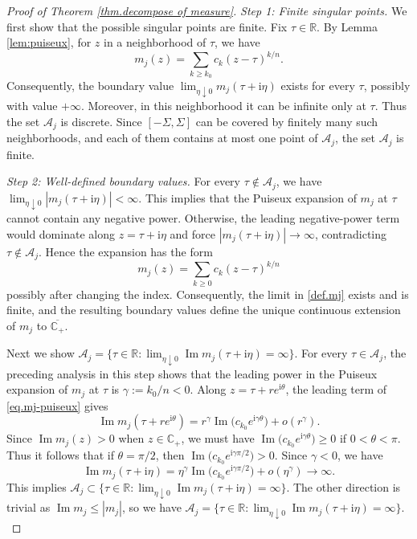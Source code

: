 \documentclass[11pt,twoside, a4paper]{article}
\numberwithin{equation}{section}
\numberwithin{figure}{section}
\theoremstyle{plain} %
\theoremstyle{definition}
\theoremstyle{remark}
\newcommand{\1} {\mspace{1 mu}}
\newcommand{\2} {\mspace{2 mu}}
\newcommand{\R} {\mathbb{R}}
\newcommand{\Cp} {\mathbb {C}_+}
\DeclareMathOperator{\im}{Im}
\begin{document}
\bigskip
\begin{proof}[Proof of Theorem \ref{thm.decompose of measure}]

\textit{Step 1: Finite singular points.}
We first show that the possible singular points are finite. Fix $\tau\in\R$. By Lemma \ref{lem:puiseux}, for $z$ in a neighborhood of $\tau$, we have
\begin{equation}\label{eq.mj-puiseux}
   m_j(z)=\sum_{k\ge k_0}c_k(z-\tau)^{k/n}.
\end{equation}
 Consequently, the boundary value
$
  \lim_{\eta\downarrow0} m_j(\tau+\mathrm i\eta)
$
exists for every \(\tau\), possibly with value \(+\infty\). Moreover, in this neighborhood it can be infinite only at \(\tau\). 
Thus the set $\mathcal{A}_j$ is discrete. 
Since \([-\Sigma,\Sigma]\) can be covered by finitely many such neighborhoods, and each of them contains at most one point of \(\mathcal A_j\), the set \(\mathcal A_j\) is finite.
\medskip

\textit{Step 2: Well-defined boundary values.} 
For every $\tau\notin\mathcal{A}_j$, we have $\lim_{\eta\downarrow 0}|m_j(\tau+\mathrm i\eta)|<\infty$. 
This implies that the Puiseux expansion of \(m_j\) at \(\tau\) cannot contain any negative power. 
Otherwise, the leading negative-power term would dominate along \(z=\tau+\mathrm i\eta\) and force \(|m_j(\tau+\mathrm i\eta)|\to\infty\), contradicting \(\tau\notin\mathcal A_j\).
Hence the expansion has the form
\begin{equation}\label{eq.nonnegative-puiseux}
    m_j(z)=\sum_{k\ge0}c_k(z-\tau)^{k/n}  
\end{equation}
possibly after changing the index. Consequently, the limit in \eqref{def.mj} exists and is finite, and the resulting boundary values define the unique continuous extension of \(m_j\) to \(\overline{\mathbb C_+}\).

Next we show $\mathcal{A}_j=\big\{\tau\in\mathbb R:
  \lim_{\eta\downarrow0}\im m_j(\tau+\mathrm i\eta)=\infty
  \big\}$. For every \(\tau\in\mathcal A_j\), the preceding analysis in this step shows
  that the leading power in the Puiseux expansion of \(m_j\) at \(\tau\) is
  $
  \gamma:=k_0/n<0.
  $
  Along \(z=\tau+r e^{\mathrm i\theta}\),
the leading term of \eqref{eq.mj-puiseux} gives
\[
  \im m_j(\tau+r e^{\mathrm i\theta})
  =
  r^\gamma \im \bigl(c_{k_0}e^{\mathrm i\gamma\theta}\bigr)
  +o(r^\gamma).
\]
Since \(\im m_j(z)>0\) when $z\in \Cp$, 
we must have $\im \bigl(c_{k_0}e^{\mathrm i\gamma\theta}\bigr)\geq 0$ if $0<\theta<\pi$. Thus it follows that if \(\theta=\pi/2\), then $\im \bigl(c_{k_0}e^{\mathrm i\gamma\pi/2}\bigr)> 0$. Since \(\gamma<0\), we have
\[
  \im m_j(\tau+\mathrm i\eta)
  =
  \eta^\gamma
  \im \bigl(c_{k_0}e^{\mathrm i\gamma\pi/2}\bigr)
  +o(\eta^\gamma)
  \to\infty.
\]
  This implies $\mathcal{A}_j\subset\big\{\tau\in\mathbb R:
  \lim_{\eta\downarrow0}\im m_j(\tau+\mathrm i\eta)=\infty
  \big\}$. The other direction is trivial as $\im m_j\le |m_j|$, so we have $\mathcal{A}_j=\big\{\tau\in\mathbb R:
  \lim_{\eta\downarrow0}\im m_j(\tau+\mathrm i\eta)=\infty
  \big\}.$


\end{proof}
\end{document}
